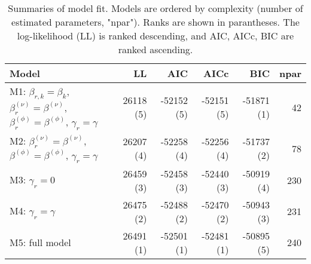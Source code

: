 \begin{table}[ht]
\centering
\begingroup\fontsize{9pt}{10pt}\selectfont
\begin{tabular}{l|rrrrr}
  \hline
Model & LL & AIC & AICc & BIC & npar \\ 
  \hline
M1: $\beta_{r,k} = \beta_{k}$, $\beta_{r}^{(\nu)} = \beta^{(\nu)}$, $\beta_{r}^{(\phi)} = \beta^{(\phi)}$, $\gamma_r = \gamma$ & 26118 (5) & -52152 (5) & -52151 (5) & -51871 (1) & 42 \\ 
  M2: $\beta_{r}^{(\nu)} = \beta^{(\nu)}$, $\beta^{(\phi)} = \beta^{(\phi)}$, $\gamma_r = \gamma$ & 26207 (4) & -52258 (4) & -52256 (4) & -51737 (2) & 78 \\ 
  M3: $\gamma_r = 0$ & 26459 (3) & -52458 (3) & -52440 (3) & -50919 (4) & 230 \\ 
  M4: $\gamma_r = \gamma$ & 26475 (2) & -52488 (2) & -52470 (2) & -50943 (3) & 231 \\ 
  M5: full model & 26491 (1) & -52501 (1) & -52481 (1) & -50895 (5) & 240 \\ 
   \hline
\end{tabular}
\endgroup
\caption{Summaries of model fit.
Models are ordered by complexity (number of estimated parameters, "npar").
Ranks are shown in parantheses.
The log-likelihood (LL) is ranked descending,
and AIC, AICc, BIC are ranked ascending.} 
\label{tab:mBetafit}
\end{table}
